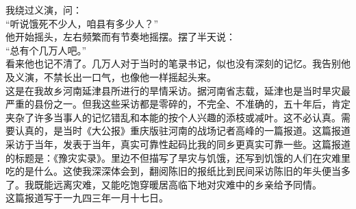 我绕过义演，问：\\

“听说饿死不少人，咱县有多少人？”\\

他开始摇头，左右频繁而有节奏地摇摆。摆了半天说：\\

“总有个几万人吧。”\\

看来他也记不清了。几万人对于当时的笔录书记，似也没有深刻的记忆。我告别他及义演，不禁长出一口气，也像他一样摇起头来。\\

这是在我故乡河南延津县所进行的旱情采访。据河南省志载，延津也是当时旱灾最严重的县份之一。但我这些采访都是零碎的，不完全、不准确的，五十年后，肯定夹杂了许多当事人的记忆错乱和本能的按个人兴趣的添枝或减叶。这不必认真。需要认真的，是当时《大公报》重庆版驻河南的战场记者高峰的一篇报道。这篇报道采访于当年，发表于当年，真实可靠性起码比我的同乡更真实可靠一些。这篇报道的标题是：《豫灾实录》。里边不但描写了旱灾与饥饿，还写到饥饿的人们在灾难里吃的是什么。这使我深深体会到，翻阅陈旧的报纸比到民间采访陈旧的年头便当多了。我既能远离灾难，又能吃饱穿暖居高临下地对灾难中的乡亲给予同情。\\

这篇报道写于一九四三年一月十七日。\\

